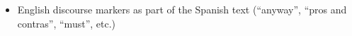 \begin{itemize}
\begin{comment}
      "The displacements operated by capitalism allowed it to escape the constraints that had gradually been constructed in response to the social critique, and were possible without provoking large-scale resistance becausethey seemed to satisfy the demands issuing from a different critical current." (p.200)
      "What we have observed of the role of critique in the .. also the displacements and transformations, of capitalism .. always conductive to greater social well-being - leads us to underscore the inadequacies of critical activity, as well as the incredible flexibility of the capitalist process. This process is capable of conforming to societies with aspirations that vary greatly over time (but also in space, though that is not our subject), and of recuperatig the ideas of those who were its enemies in a previous phase." (p.200-201)
      "By contrast, it was by opposing a social capitalism planned and supervised by the state - treated as obsolete, cramped and constraining - and leaning on the artistic critique (autonomy and creativity) that the new spirit of capitalism gradually took shape at the end of the crisis of the 1960s and 1970s, and undertook to restore the prestige of capitalism. Turning its back on the social demands that had dominated the first half of the 1970s, the new spirit was receptive to the critiques of the period that denounced the mechanization of the world (post-industrial society against industrial society) - the destruction of forms of life conductive to the fulfilment of specifically human potential and, in particular, creativity - and stressed the intolerable character of the .. of oppression which, without necessarily deriving directly from historical capitalism, had been exploited by capitalis mechanisms for organizing .." (p.201)
      "By adapting these sets of demands to the description of a new, liberated and even libertarian way of making profit - which was also said to allow for realization of the self and its most personal aspirations.." (p.201)
      "By helping to overthrow the conventions bound up with the old domestic world, and also to overcome the inflexibilities of the industrial order - bureaucratic hierarchies and standardized production - the artistic critique opened up an opportunity for capitalism to base itself on new forms of control and commodify new, more individualized and 'authentic' goods." (p.467, The Test of the Artistic Critique)
    \end{comment}
  \item English discourse markers as part of the Spanish text  (``anyway'', ``pros and contras'', ``must'', etc.)%

\end{itemize}
